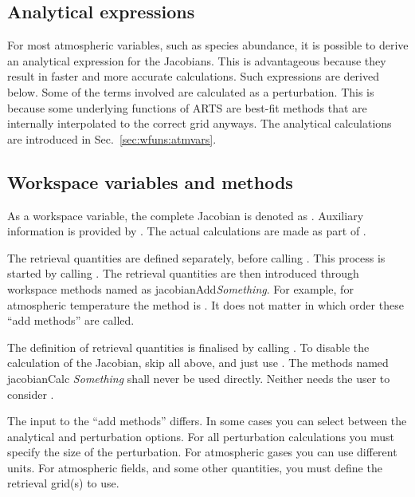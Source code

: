 \subsection{Analytical expressions}
\label{sec:wfuns:anal}
%
For most atmospheric variables, such as species abundance, it is possible to
derive an analytical expression for the Jacobians. This is advantageous because
they result in faster and more accurate calculations. Such expressions are
derived below. Some of the terms involved are calculated as a perturbation.
This is because some underlying functions of ARTS are best-fit methods that
are internally interpolated to the correct grid anyways. 
The analytical calculations are introduced in Sec.~\ref{sec:wfuns:atmvars}. 


\subsection{Workspace variables and methods}
\label{sec:wfuns:wsm}
%
As a workspace variable, the complete Jacobian is denoted as
. Auxiliary information is provided by
. The actual calculations are made as part of
.

The retrieval quantities are defined separately, before calling
. This process is started by calling .
The retrieval quantities are then introduced through workspace methods named as
jacobianAdd{\it Something}. For example, for atmospheric temperature the method
is . It does not matter in which order these
``add methods'' are called.

The definition of retrieval quantities is finalised by calling
. To disable the calculation of the Jacobian, skip all
above, and just use . The methods named jacobianCalc{\it
  Something} shall never be used directly. Neither needs the user to consider
.

The input to the ``add methods'' differs. In some cases you can select between
the analytical and perturbation options. For all perturbation calculations you
must specify the size of the perturbation. For atmospheric gases you can use
different units. For atmospheric fields, and some other quantities, you must
define the retrieval grid(s) to use.



